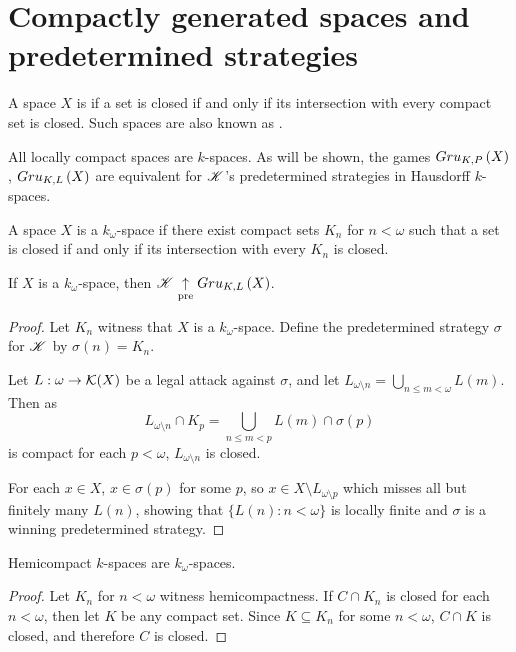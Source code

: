 \section{Compactly generated spaces and predetermined strategies}

\begin{defn}
  A space $X$ is  if a set is closed if and
  only if its intersection with every compact set is closed. Such
  spaces are also known as .
\end{defn}

All locally compact spaces are $k$-spaces. As will be shown,
the games $Gru_{K,P}\left({X}\right)$, $Gru_{K,L}\left({X}\right)$ are equivalent for $\mathscr{K}$'s
predetermined strategies in Hausdorff $k$-spaces.

\begin{defn}
  A space $X$ is a $k_\omega$-space if there exist compact sets $K_n$ for
  $n<\omega$ such that a set is closed if and
  only if its intersection with every $K_n$ is closed.
\end{defn}

\begin{thm}
  If $X$ is a $k_\omega$-space, then
  $\mathscr{K} \underset{\text{pre}}{\uparrow} Gru_{K,L}\left({X}\right)$.
\end{thm}

\begin{proof}
  Let $K_n$ witness that $X$ is a $k_\omega$-space. Define the predetermined
  strategy $\sigma$ for $\mathscr{K}$ by $\sigma(n)=K_n$.

  Let $L:\omega\to\mathcal{K}(X)$ be a legal attack against $\sigma$, and let
  $L_{\omega\setminus n} = \bigcup_{n\leq m<\omega}L(m)$. Then as
    \[
      L_{\omega\setminus n}\cap K_p
        =
      \bigcup_{n\leq m< p}L(m) \cap \sigma(p)
    \]
  is compact for each $p<\omega$, $L_{\omega\setminus n}$ is closed.

  For each $x\in X$, $x\in \sigma(p)$ for some $p$, so
  $x\in X\setminus L_{\omega\setminus p}$ which misses all but finitely
  many $L(n)$, showing that $\{L(n):n<\omega\}$ is locally finite and
  $\sigma$ is a winning predetermined strategy.
\end{proof}

\begin{prop}
  Hemicompact $k$-spaces are $k_\omega$-spaces.
\end{prop}

\begin{proof}
  Let $K_n$ for $n<\omega$ witness hemicompactness.
  If $C\cap K_n$ is closed for each $n<\omega$, then let $K$ be any compact
  set. Since $K\subseteq K_n$ for some $n<\omega$, $C\cap K$ is closed, and
  therefore $C$ is closed.
\end{proof}

